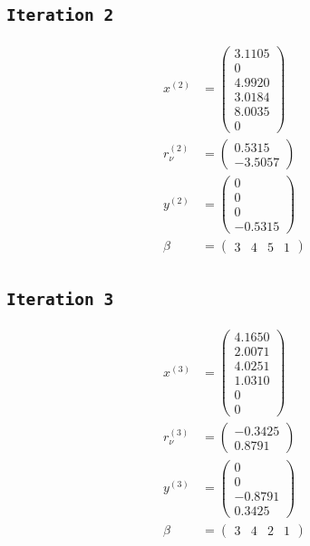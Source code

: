 \documentclass{assignment}
\def\code#1{\texttt{#1}}
\begin{document}
\subsection*{\code{Iteration 2}}
\begin{align*}
    x^{(2)} &= \begin{pmatrix} 3.1105 \\ 0 \\ 4.9920 \\ 3.0184 \\ 8.0035 \\ 0 \end{pmatrix} \\
    r_{\nu}^{(2)} &= \begin{pmatrix} 0.5315 \\ -3.5057 \end{pmatrix} \\
    y^{(2)} &= \begin{pmatrix} 0 \\ 0 \\ 0 \\ -0.5315 \end{pmatrix} \\
    \beta &= \begin{pmatrix} 3 & 4 & 5 & 1 \end{pmatrix}
\end{align*}
\subsection*{\code{Iteration 3}}
\begin{align*}
    x^{(3)} &= \begin{pmatrix} 4.1650 \\ 2.0071 \\ 4.0251 \\ 1.0310 \\ 0 \\ 0 \end{pmatrix} \\
    r_{\nu}^{(3)} &= \begin{pmatrix} -0.3425 \\ 0.8791 \end{pmatrix} \\
    y^{(3)} &= \begin{pmatrix} 0 \\ 0 \\ -0.8791 \\ 0.3425 \end{pmatrix} \\
    \beta &= \begin{pmatrix} 3 & 4 & 2 & 1 \end{pmatrix}
\end{align*}
\end{document}
